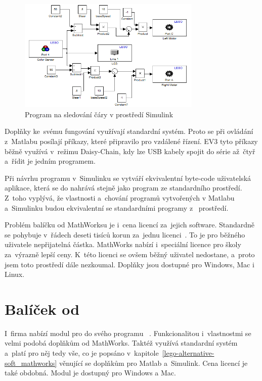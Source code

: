 \begin{figure}[h]
	\centering
	\includegraphics[width=330px]{images/mathworks-simulink_line-tracking-model.png}
	\caption[Program na sledování čáry v prostředí Simulink]{Program na sledování čáry v prostředí Simulink\protect\footnotemark}
	\label{fig:mathworks-simulink_line-tracking-model}
\end{figure}


Doplňky ke~svému fungování využívají standardní \lego{} systém. 
Proto se při ovládání  z~Matlabu posílají příkazy, které \lego{} připravilo pro vzdálené řízení. 
EV3 tyto příkazy běžně využívá v~režimu Daisy-Chain, kdy lze USB kabely spojit do série až~čtyř  a~řídit je jedním programem.     

Při návrhu programu v~Simulinku se vytváří ekvivalentní byte-code uživatelská aplikace, která se do  nahrává stejně jako program ze standardního \lego{} prostředí. 
Z~toho vyplývá, že vlastnosti a~chování programů vytvořených v Matlabu a~Simulinku budou ekvivalentní se standardními programy z~\lego{} prostředí.

Problém balíčku od MathWorksu je i~cena licencí za~jejich software. 
Standardně se pohybuje v~řádech deseti tisíců korun za~jednu licenci~\cite{legoProgramingPlatform_MathWork_Humusoft-price}.
To je pro běžného uživatele nepřijatelná částka. 
MathWorks nabízí i~speciální licence pro školy za~výrazně lepší ceny. 
K~této licenci se ovšem běžný uživatel nedostane, a~proto jsem toto prostředí dále nezkoumal.
Doplňky jsou dostupné pro Windows, Mac i  Linux. 
 

\section{Balíček od \NI}

I~firma \NI{} nabízí modul pro \legoM{} do svého programu \labview{}~\cite{legoProgramingPlatform_NI_LabVIEW}. 
Funkcionalitou i~vlastnostmi se velmi podobá doplňkům od MathWorks.
Taktéž využívá standardní \lego{} systém a~platí pro něj tedy vše, co je popsáno v~kapitole~\ref{lego-alternative-soft_mathworks} věnující se doplňkům pro Matlab a~Simulink. 
Cena licencí je také obdobná. Modul je dostupný pro Windows a Mac. 


